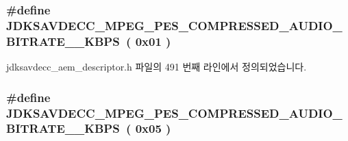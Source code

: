 \subsubsection[{\texorpdfstring{J\+D\+K\+S\+A\+V\+D\+E\+C\+C\+\_\+\+M\+P\+E\+G\+\_\+\+P\+E\+S\+\_\+\+C\+O\+M\+P\+R\+E\+S\+S\+E\+D\+\_\+\+A\+U\+D\+I\+O\+\_\+\+B\+I\+T\+R\+A\+T\+E\+\_\+40\+\_\+\+K\+B\+PS}{JDKSAVDECC_MPEG_PES_COMPRESSED_AUDIO_BITRATE_40_KBPS}}]{\setlength{\rightskip}{0pt plus 5cm}\#define J\+D\+K\+S\+A\+V\+D\+E\+C\+C\+\_\+\+M\+P\+E\+G\+\_\+\+P\+E\+S\+\_\+\+C\+O\+M\+P\+R\+E\+S\+S\+E\+D\+\_\+\+A\+U\+D\+I\+O\+\_\+\+B\+I\+T\+R\+A\+T\+E\+\_\+\_\+\+K\+B\+PS~( 0x01 )}\hypertarget{group__mpeg__pes__compressed__audio__bitrate_ga81d531f1c8fb1025e48e58c9435c03e6}{}\label{group__mpeg__pes__compressed__audio__bitrate_ga81d531f1c8fb1025e48e58c9435c03e6}


jdksavdecc\+\_\+aem\+\_\+descriptor.\+h 파일의 491 번째 라인에서 정의되었습니다.

\subsubsection[{\texorpdfstring{J\+D\+K\+S\+A\+V\+D\+E\+C\+C\+\_\+\+M\+P\+E\+G\+\_\+\+P\+E\+S\+\_\+\+C\+O\+M\+P\+R\+E\+S\+S\+E\+D\+\_\+\+A\+U\+D\+I\+O\+\_\+\+B\+I\+T\+R\+A\+T\+E\+\_\+48\+\_\+\+K\+B\+PS}{JDKSAVDECC_MPEG_PES_COMPRESSED_AUDIO_BITRATE_48_KBPS}}]{\setlength{\rightskip}{0pt plus 5cm}\#define J\+D\+K\+S\+A\+V\+D\+E\+C\+C\+\_\+\+M\+P\+E\+G\+\_\+\+P\+E\+S\+\_\+\+C\+O\+M\+P\+R\+E\+S\+S\+E\+D\+\_\+\+A\+U\+D\+I\+O\+\_\+\+B\+I\+T\+R\+A\+T\+E\+\_\+\_\+\+K\+B\+PS~( 0x05 )}\hypertarget{group__mpeg__pes__compressed__audio__bitrate_ga5d3403769d525d5a3500ee4cf9bf1c9f}{}\label{group__mpeg__pes__compressed__audio__bitrate_ga5d3403769d525d5a3500ee4cf9bf1c9f}


